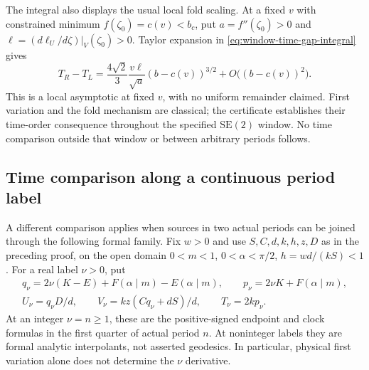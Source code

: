 \documentclass[11pt,a4paper]{article}
\theoremstyle{remark}\newtheorem{remark}[theorem]{Remark}
\begin{document}
The integral also displays the usual local fold scaling. At a fixed
$v$ with constrained minimum $f(\zeta_0)=c(v)<b_c$, put
$a=f''(\zeta_0)>0$ and $\ell=(d\ell_U/d\zeta)|_V(\zeta_0)>0$.
Taylor expansion in \eqref{eq:window-time-gap-integral} gives
\[
 T_R-T_L=\frac{4\sqrt2}{3}\frac{v\ell}{\sqrt a}
          (b-c(v))^{3/2}+O\bigl((b-c(v))^2\bigr).
\]
This is a local asymptotic at fixed $v$, with no uniform remainder
claimed. First variation and the fold mechanism are classical; the
certificate establishes their time-order consequence throughout the
specified $\mathrm{SE}(2)$ window. No time comparison outside that
window or between arbitrary periods follows.






\subsection{Time comparison along a continuous period label}
\label{sec:period-action}

A different comparison applies when sources in two actual periods can
be joined through the following formal family. Fix $w>0$ and use
$S,C,d,k,h,z,D$ as in the preceding proof, on the open domain
$0<m<1$, $0<\alpha<\pi/2$, $h=wd/(kS)<1$. For a real label $\nu>0$, put
\begin{equation}\label{eq:period-family}
 \begin{gathered}
 q_\nu=2\nu(K-E)+F(\alpha\mid m)-E(\alpha\mid m),\qquad
 p_\nu=2\nu K+F(\alpha\mid m),\\
 U_\nu=q_\nu D/d,\qquad V_\nu=kz(Cq_\nu+dS)/d,\qquad
 T_\nu=2k p_\nu.
 \end{gathered}
\end{equation}
At an integer $\nu=n\ge1$, these are the positive-signed endpoint and
clock formulas in the first quarter of actual period $n$. At noninteger
labels they are formal analytic interpolants, not asserted geodesics.
In particular, physical first variation alone does not determine the
$\nu$ derivative.
\end{document}
